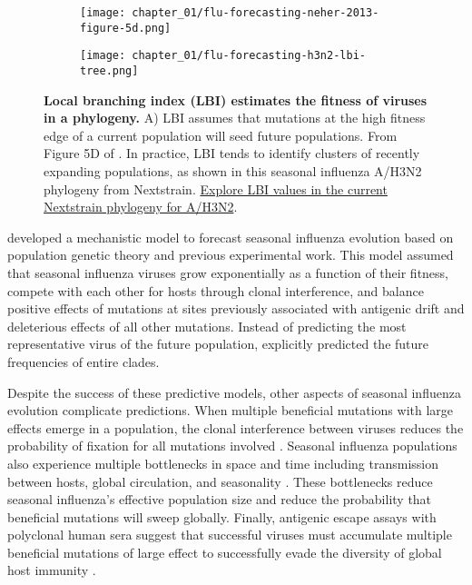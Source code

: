\begin{figure}
  \centering
  \begin{subfigure}[b]{0.5\columnwidth}
    \centering
    \texttt{[image: chapter\_01/flu-forecasting-neher-2013-figure-5d.png]}
    \label{fig:lbi-theory}
  \end{subfigure}

  \begin{subfigure}[b]{0.65\columnwidth}
    \centering
    \texttt{[image: chapter\_01/flu-forecasting-h3n2-lbi-tree.png]}
    \label{fig:lbi-practice}
  \end{subfigure}

  \caption[{Local branching index (LBI) estimates the fitness of viruses in a phylogeny.}]{{\bf Local branching index (LBI) estimates the fitness of viruses in a phylogeny.}
    A) LBI assumes that mutations at the high fitness edge of a current population will seed future populations.
    From Figure 5D of \citet{Neher2013}.
    In practice, LBI tends to identify clusters of recently expanding populations, as shown in this seasonal influenza A/H3N2 phylogeny from Nextstrain.
    \href{https://nextstrain.org/flu/seasonal/h3n2/ha/2y?c=lbi}{Explore LBI values in the current Nextstrain phylogeny for A/H3N2}.
  }
  \label{fig:lbi}
\end{figure}

\citet{Luksza:2014hj} developed a mechanistic model to forecast seasonal influenza evolution based on population genetic theory and previous experimental work.
This model assumed that seasonal influenza viruses grow exponentially as a function of their fitness, compete with each other for hosts through clonal interference, and balance positive effects of mutations at sites previously associated with antigenic drift and deleterious effects of all other mutations.
Instead of predicting the most representative virus of the future population, \citet{Luksza:2014hj} explicitly predicted the future frequencies of entire clades.

Despite the success of these predictive models, other aspects of seasonal influenza evolution complicate predictions.
When multiple beneficial mutations with large effects emerge in a population, the clonal interference between viruses reduces the probability of fixation for all mutations involved \citep{strelkowa2012clonal}.
Seasonal influenza populations also experience multiple bottlenecks in space and time including transmission between hosts, global circulation, and seasonality \citep{Xue2018,Petrova2018}.
These bottlenecks reduce seasonal influenza's effective population size and reduce the probability that beneficial mutations will sweep globally.
Finally, antigenic escape assays with polyclonal human sera suggest that successful viruses must accumulate multiple beneficial mutations of large effect to successfully evade the diversity of global host immunity \citep{Lee2019}.


